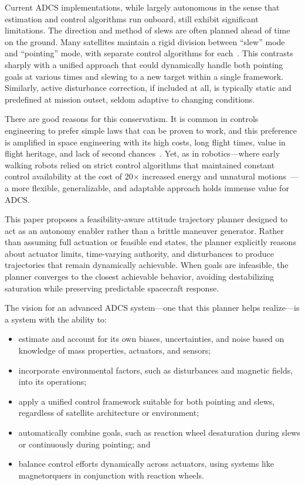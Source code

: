 \documentclass[conference]{IEEEtran}
\begin{document}
Current ADCS implementations, while largely autonomous in the sense that estimation and control algorithms run onboard, still exhibit significant limitations. The direction and method of slews are often planned ahead of time on the ground. Many satellites maintain a rigid division between ``slew'' mode and ``pointing'' mode, with separate control algorithms for each~\cite{markley2014fundamentals}. This contrasts sharply with a unified approach that could dynamically handle both pointing goals at various times and slewing to a new target within a single framework. Similarly, active disturbance correction, if included at all, is typically static and predefined at mission outset, seldom adaptive to changing conditions.

There are good reasons for this conservatism. It is common in controls engineering to prefer simple laws that can be proven to work, and this preference is amplified in space engineering with its high costs, long flight times, value in flight heritage, and lack of second chances~\cite{fortescue2011spacecraft}. Yet, as in robotics---where early walking robots relied on strict control algorithms that maintained constant control availability at the cost of 20$\times$ increased energy and unnatural motions~\cite{Tedrake_text}---a more flexible, generalizable, and adaptable approach holds immense value for ADCS.

This paper proposes a feasibility-aware attitude trajectory planner designed to act as an autonomy enabler rather than a brittle maneuver generator. Rather than assuming full actuation or feasible end states, the planner explicitly reasons about actuator limits, time-varying authority, and disturbances to produce trajectories that remain dynamically achievable. When goals are infeasible, the planner converges to the closest achievable behavior, avoiding destabilizing saturation while preserving predictable spacecraft response.

The vision for an advanced ADCS system---one that this planner helps realize---is a system with the ability to:
\begin{itemize}
    \item estimate and account for its own biases, uncertainties, and noise based on knowledge of mass properties, actuators, and sensors;
    \item incorporate environmental factors, such as disturbances and magnetic fields, into its operations;
    \item apply a unified control framework suitable for both pointing and slews, regardless of satellite architecture or environment;
    \item automatically combine goals, such as reaction wheel desaturation during slews or continuously during pointing; and
    \item balance control efforts dynamically across actuators, using systems like magnetorquers in conjunction with reaction wheels.
\end{itemize}
\end{document}
